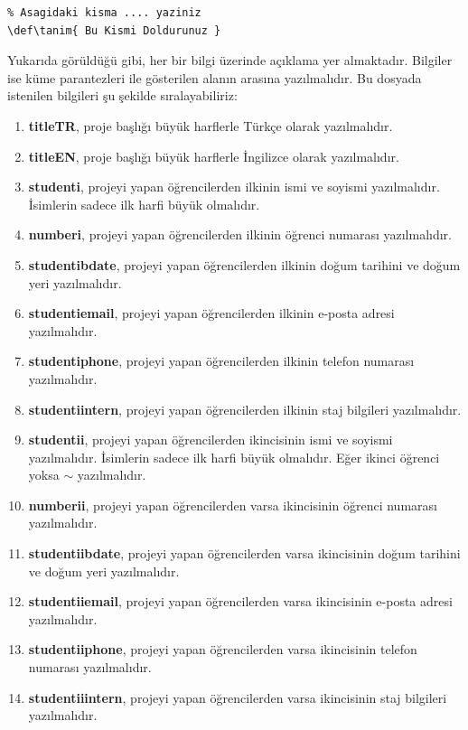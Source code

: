 \begin{verbatim}
% Asagidaki kisma .... yaziniz
\def\tanim{ Bu Kismi Doldurunuz }
\end{verbatim}

Yukarıda görüldüğü gibi, her bir bilgi üzerinde açıklama yer almaktadır. Bilgiler ise küme parantezleri ile gösterilen alanın arasına yazılmalıdır. Bu dosyada istenilen bilgileri şu şekilde sıralayabiliriz:

\begin{enumerate}
    \item \textbf{titleTR}, proje başlığı büyük harflerle Türkçe olarak yazılmalıdır.
    \item \textbf{titleEN}, proje başlığı büyük harflerle İngilizce olarak yazılmalıdır.
    \item \textbf{studenti}, projeyi yapan öğrencilerden ilkinin ismi ve soyismi yazılmalıdır. İsimlerin sadece ilk harfi büyük olmalıdır.
    \item \textbf{numberi}, projeyi yapan öğrencilerden ilkinin öğrenci numarası yazılmalıdır.
    \item \textbf{studentibdate}, projeyi yapan öğrencilerden ilkinin doğum tarihini ve doğum yeri yazılmalıdır.
    \item \textbf{studentiemail}, projeyi yapan öğrencilerden ilkinin e-posta adresi yazılmalıdır.
    \item \textbf{studentiphone}, projeyi yapan öğrencilerden ilkinin telefon numarası yazılmalıdır.
    \item \textbf{studentiintern}, projeyi yapan öğrencilerden ilkinin staj bilgileri yazılmalıdır.
    \item \textbf{studentii}, projeyi yapan öğrencilerden ikincisinin ismi ve soyismi yazılmalıdır. İsimlerin sadece ilk harfi büyük olmalıdır. Eğer ikinci öğrenci yoksa $\sim$ yazılmalıdır.
    \item \textbf{numberii}, projeyi yapan öğrencilerden varsa ikincisinin öğrenci numarası yazılmalıdır.
    \item \textbf{studentiibdate}, projeyi yapan öğrencilerden varsa ikincisinin doğum tarihini ve doğum yeri yazılmalıdır.
    \item \textbf{studentiiemail}, projeyi yapan öğrencilerden varsa ikincisinin e-posta adresi yazılmalıdır.
    \item \textbf{studentiiphone}, projeyi yapan öğrencilerden varsa ikincisinin telefon numarası yazılmalıdır.
    \item \textbf{studentiiintern}, projeyi yapan öğrencilerden varsa ikincisinin staj bilgileri yazılmalıdır.

\end{enumerate}
